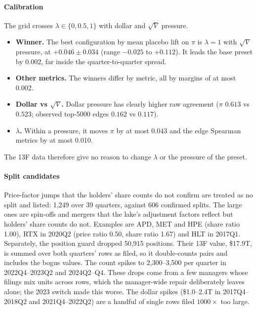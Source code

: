 \documentclass[preprint,3p,twocolumn]{elsarticle}
\begin{document}
\paragraph{Calibration} The grid crosses $\lambda\in\{0,0.5,1\}$ with dollar and $\sqrt{V}$ pressure.
\begin{itemize}
\item \textbf{Winner.} The best configuration by mean placebo lift on $\pi$ is $\lambda=1$ with $\sqrt{V}$ pressure, at $+0.046\pm0.034$ (range $-0.025$ to $+0.112$). It leads the base preset by 0.002, far inside the quarter-to-quarter spread.
\item \textbf{Other metrics.} The winners differ by metric, all by margins of at most 0.002.
\item \textbf{Dollar vs $\sqrt{V}$.} Dollar pressure has clearly higher raw agreement ($\pi$ $0.613$ vs $0.523$; observed top-5000 edges $0.162$ vs $0.117$).
\item \textbf{$\lambda$.} Within a pressure, it moves $\pi$ by at most 0.043 and the edge Spearman metrics by at most 0.010.
\end{itemize}
The 13F data therefore give no reason to change $\lambda$ or the pressure of the preset.

\paragraph{Split candidates} Price-factor jumps that the holders' share counts do not confirm are treated as no split and listed: 1,249 over 39 quarters, against 606 confirmed splits. The large ones are spin-offs and mergers that the lake's adjustment factors reflect but holders' share counts do not. Examples are APD, MET and HPE (share ratio 1.00), RTX in 2020Q2 (price ratio 0.50, share ratio 1.67) and HLT in 2017Q1. Separately, the position guard dropped 50,915 positions. Their 13F value, \$17.9T, is summed over both quarters' rows as filed, so it double-counts pairs and includes the bogus values. The count spikes to 2,300--3,500 per quarter in 2022Q4--2023Q2 and 2024Q2--Q4. These drops come from a few managers whose filings mix units across rows, which the manager-wide repair deliberately leaves alone; the 2023 switch made this worse. The dollar spikes (\$1.0--2.4T in 2017Q4--2018Q2 and 2021Q4--2022Q2) are a handful of single rows filed $1000\times$ too large.
\end{document}
